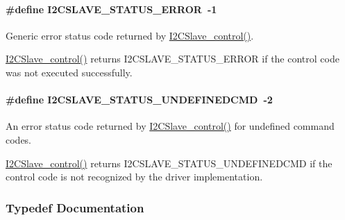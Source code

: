 \paragraph[{I2\+C\+S\+L\+A\+V\+E\+\_\+\+S\+T\+A\+T\+U\+S\+\_\+\+E\+R\+R\+O\+R}]{\setlength{\rightskip}{0pt plus 5cm}\#define I2\+C\+S\+L\+A\+V\+E\+\_\+\+S\+T\+A\+T\+U\+S\+\_\+\+E\+R\+R\+O\+R~-\/1}\label{_i2_c_slave_8h_acae8b3350c196cdb215b25d7ca170708}


Generic error status code returned by \hyperlink{_i2_c_slave_8h_abcd38688f29738ee33b1748a42a3b140}{I2\+C\+Slave\+\_\+control()}. 

\hyperlink{_i2_c_slave_8h_abcd38688f29738ee33b1748a42a3b140}{I2\+C\+Slave\+\_\+control()} returns I2\+C\+S\+L\+A\+V\+E\+\_\+\+S\+T\+A\+T\+U\+S\+\_\+\+E\+R\+R\+O\+R if the control code was not executed successfully. 
\paragraph[{I2\+C\+S\+L\+A\+V\+E\+\_\+\+S\+T\+A\+T\+U\+S\+\_\+\+U\+N\+D\+E\+F\+I\+N\+E\+D\+C\+M\+D}]{\setlength{\rightskip}{0pt plus 5cm}\#define I2\+C\+S\+L\+A\+V\+E\+\_\+\+S\+T\+A\+T\+U\+S\+\_\+\+U\+N\+D\+E\+F\+I\+N\+E\+D\+C\+M\+D~-\/2}\label{_i2_c_slave_8h_a379b9d624bb9cd78f3d4991cc2d15dd2}


An error status code returned by \hyperlink{_i2_c_slave_8h_abcd38688f29738ee33b1748a42a3b140}{I2\+C\+Slave\+\_\+control()} for undefined command codes. 

\hyperlink{_i2_c_slave_8h_abcd38688f29738ee33b1748a42a3b140}{I2\+C\+Slave\+\_\+control()} returns I2\+C\+S\+L\+A\+V\+E\+\_\+\+S\+T\+A\+T\+U\+S\+\_\+\+U\+N\+D\+E\+F\+I\+N\+E\+D\+C\+M\+D if the control code is not recognized by the driver implementation. 

\subsubsection{Typedef Documentation}
